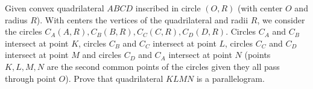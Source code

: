 Given convex quadrilateral $ABCD$ inscribed in circle $(O,R)$ (with center $O$ and radius $R$). With centers the vertices of the quadrilateral and radii $R$, we consider the circles $C_A(A,R), C_B(B,R), C_C(C,R), C_D(D,R)$. Circles $C_A$ and $C_B$ intersect at point $K$, circles $C_B$ and $C_C$ intersect at point $L$, circles $C_C$ and $C_D$ intersect at point $M$ and circles $C_D$ and $C_A$ intersect at point $N$ (points $K,L,M,N$ are the second common points of the circles given they all pass through point $O$). Prove that  quadrilateral $KLMN$ is a parallelogram.